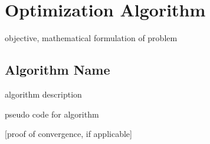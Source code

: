 \chapter{Optimization Algorithm}
\label{chapter:optimization}

objective, mathematical formulation of problem

\section{Algorithm Name}

algorithm description

pseudo code for algorithm

[proof of convergence, if applicable]